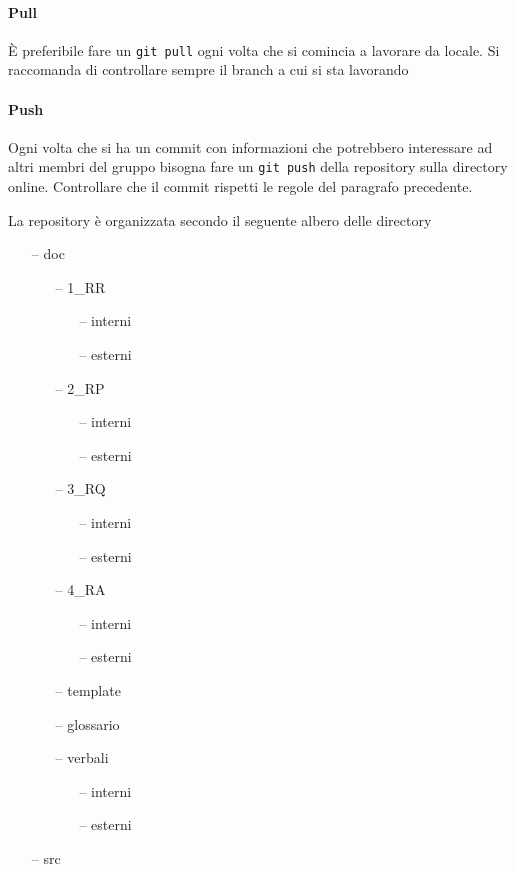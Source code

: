 \documentclass[12pt,a4paper]{article}
\begin{document}
\paragraph{Pull}
È preferibile fare un \texttt{git pull} ogni volta che si comincia a lavorare da locale. Si raccomanda di controllare sempre il branch a cui si sta lavorando
\paragraph{Push}
Ogni volta che si ha un commit con informazioni che potrebbero interessare ad altri membri del gruppo bisogna fare un \texttt{git push} della repository sulla directory online. Controllare che il commit rispetti le regole del paragrafo precedente.

\newpage
{}
La repository è organizzata secondo il seguente albero delle directory
\begin{itemize}
\item[--] doc
\begin{itemize}
\item[--] 1\_RR
\begin{itemize}
\item[--] interni
\item[--] esterni
\end{itemize}
\item[--] 2\_RP
\begin{itemize}
\item[--] interni
\item[--] esterni
\end{itemize}
\item[--] 3\_RQ
\begin{itemize}
\item[--] interni
\item[--] esterni
\end{itemize}
\item[--] 4\_RA
\begin{itemize}
\item[--] interni
\item[--] esterni
\end{itemize}
\item[--] template
\item[--] glossario
\item[--] verbali
\begin{itemize}
\item[--] interni
\item[--] esterni
\end{itemize}
\end{itemize}
\item[--] src
\end{itemize}
\end{document}
